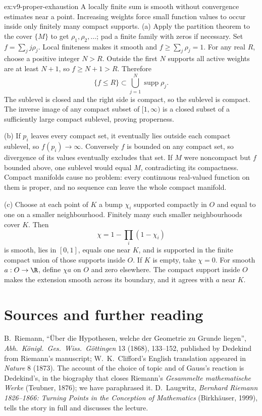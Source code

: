 \begin{solution}{ex:v9-proper-exhaustion}
\idea A locally finite sum is smooth without convergence estimates near a point. Increasing weights force small function values to occur inside only finitely many compact supports.
\writeup (a) Apply the partition theorem to the cover $\{M\}$ to get $\rho_1,\rho_2,\ldots$; pad a finite family with zeros if necessary. Set $f=\sum_jj\rho_j$. Local finiteness makes it smooth and $f\ge\sum_j\rho_j=1$. For any real $R$, choose a positive integer $N>R$. Outside the first $N$ supports all active weights are at least $N+1$, so $f\ge N+1>R$. Therefore
\[
\{f\le R\}\subset\bigcup_{j=1}^N\operatorname{supp}\rho_j.
\]
The sublevel is closed and the right side is compact, so the sublevel is compact. The inverse image of any compact subset of $[1,\infty)$ is a closed subset of a sufficiently large compact sublevel, proving properness.

(b) If $p_i$ leaves every compact set, it eventually lies outside each compact sublevel, so $f(p_i)\to\infty$. Conversely $f$ is bounded on any compact set, so divergence of its values eventually excludes that set. If $M$ were noncompact but $f$ bounded above, one sublevel would equal $M$, contradicting its compactness. Compact manifolds cause no problem: every continuous real-valued function on them is proper, and no sequence can leave the whole compact manifold.

(c) Choose at each point of $K$ a bump $\chi_i$ supported compactly in $O$ and equal to one on a smaller neighbourhood. Finitely many such smaller neighbourhoods cover $K$. Then
\[
\chi=1-\prod_i(1-\chi_i)
\]
is smooth, lies in $[0,1]$, equals one near $K$, and is supported in the finite compact union of those supports inside $O$. If $K$ is empty, take $\chi=0$. For smooth $a:O\to\R$, define $\chi a$ on $O$ and zero elsewhere. The compact support inside $O$ makes the extension smooth across its boundary, and it agrees with $a$ near $K$.
\end{solution}

\section*{Sources and further reading}

B.~Riemann, ``\"Uber die Hypothesen, welche der Geometrie zu Grunde liegen'', \emph{Abh.\ K\"onigl.\ Ges.\ Wiss.\ G\"ottingen} 13 (1868), 133--152,
published by Dedekind from Riemann's manuscript; W.~K.~Clifford's English translation appeared in \emph{Nature} 8 (1873). The account of the choice of
topic and of Gauss's reaction is Dedekind's, in the biography that closes Riemann's \emph{Gesammelte mathematische Werke} (Teubner, 1876); we have
paraphrased it. D.~Laugwitz, \emph{Bernhard Riemann 1826--1866: Turning Points in the Conception of Mathematics} (Birkh\"auser, 1999), tells the
story in full and discusses the lecture.

